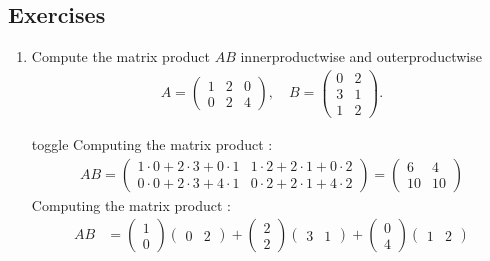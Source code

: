 \documentclass[letterpaper,10pt,english]{jupyterBook}
\begin{document}
\subsection{Exercises}
\label{\detokenize{linalg_exercises:id1}}\begin{enumerate}
%
\item {} 
\sphinxAtStartPar
Compute the matrix product \(AB\) inner\sphinxhyphen{}product\sphinxhyphen{}wise and outer\sphinxhyphen{}product\sphinxhyphen{}wise
\begin{align*}
    A=\begin{pmatrix} 1 & 2 & 0 \\
    0 & 2& 4\end{pmatrix},\quad B=\begin{pmatrix} 0 & 2 \\
    3 &1 \\
    1 & 2\end{pmatrix}.
    \end{align*}
\begin{sphinxuseclass}{toggle}
\sphinxAtStartPar
Computing the matrix product :
\begin{align*}
AB = 
\begin{pmatrix}
    1\cdot 0 + 2\cdot3+0\cdot 1 & 1\cdot2+2\cdot1 + 0\cdot 2\\
    0\cdot 0 + 2\cdot3+4\cdot 1 & 0\cdot2+2\cdot1 + 4\cdot 2
\end{pmatrix}
=
\begin{pmatrix}
    6 & 4\\
    10 & 10
\end{pmatrix}
\end{align*}
\sphinxAtStartPar
Computing the matrix product :
\begin{align*}
AB &= 
\begin{pmatrix}1 \\0\end{pmatrix}\begin{pmatrix}0&2\end{pmatrix} +
\begin{pmatrix}2 \\2\end{pmatrix}\begin{pmatrix}3&1\end{pmatrix} +
\begin{pmatrix}0 \\4\end{pmatrix}\begin{pmatrix}1&2\end{pmatrix} \\

\end{align*}
\end{sphinxuseclass}
\end{enumerate}
\end{document}
